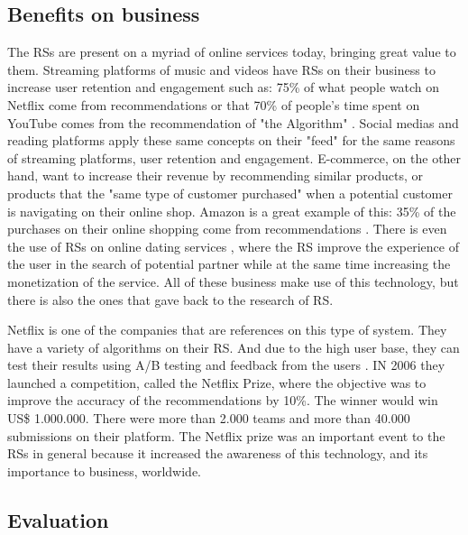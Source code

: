 \subsection{Benefits on business}

The RSs are present on a myriad of online services today, bringing great value to them. Streaming platforms of music and videos have RSs on their business to increase user retention and engagement such as: 75\% of what people watch on Netflix come from recommendations \cite{HowretailerscankeepupwithconsumersMcKinsey} or that 70\% of people's time spent on YouTube comes from the recommendation of "the Algorithm" \cite{CES2018YouTubesAIrecommendationsdrive70percentofviewingCNET}. Social medias and reading platforms apply these same concepts on their "feed" for the same reasons of streaming platforms, user retention and engagement. E-commerce, on the other hand, want to increase their revenue by recommending similar products, or products that the "same type of customer purchased" when a potential customer is navigating on their online shop. Amazon is a great example of this: 35\% of the purchases on their online shopping come from recommendations \cite{HowretailerscankeepupwithconsumersMcKinsey}. There is even the use of RSs on online dating services \cite{brozovsky2007recommender}, where the RS improve the experience of the user in the search of potential partner while at the same time increasing the monetization of the service. All of these business make use of this technology, but there is also the ones that gave back to the research of RS.

Netflix is one of the companies that are references on this type of system. They have a variety of algorithms on their RS. And due to the high user base, they can test their results using A/B testing and feedback from the users \cite{gomez2016netflix}. IN 2006 they launched a competition, called the Netflix Prize, where the objective was to improve the accuracy of the recommendations by 10\%. The winner would win US\$ 1.000.000. There were more than 2.000 teams and more than 40.000 submissions on their platform. The Netflix prize was an important event to the RSs in general because it increased the awareness of this technology, and its importance to business, worldwide. 

\subsection{Evaluation}
\label{ch:evaluation}

